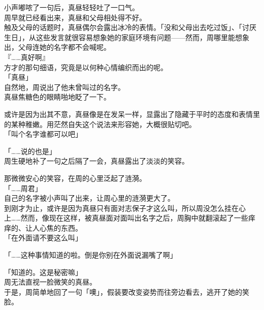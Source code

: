 小声嘟哝了一句后，真昼轻轻吐了一口气。\\

周早就已经看出来，真昼和父母相处得不好。\\

触及父母的话题时，真昼偶尔会露出冰冷的表情。「没和父母出去吃过饭」、「讨厌生日」，从这些发言就很容易想象她的家庭环境有问题——然而，周哪里能想象出，父母连她的名字都不会喊呢。\\

『……真好啊』\\

方才的那句细语，究竟是以何种心情编织而出的呢。\\

「真昼」\\

自然地，周说出了他未曾叫过的名字。\\

真昼焦糖色的眼睛啪地眨了一下。

或许是因为出其不意，真昼像是在发呆一样，显露出了隐藏于平时的态度和表情里的某种稚嫩。用茫然自失这个说法来形容她，大概很贴切吧。\\

「叫个名字谁都可以吧」

「……说的也是」\\

周生硬地补了一句之后隔了一会，真昼露出了淡淡的笑容。

那微微安心的笑容，在周的心里泛起了涟漪。\\

「……周君」\\

自己的名字被小声叫了出来，让周心里的涟漪更大了。\\

到刚才为止，或许是因为真昼只有面对志保子才这么叫，所以周没怎么挂在心上……然而，像现在这样，被真昼面对面叫出名字之后，周胸中就翻滚起了一些痒痒的、让人心焦的东西。\\

「在外面请不要这么叫」

「……这种事情知道的啦。倒是你别在外面说漏嘴了啊」

「知道的。这是秘密嘛」\\

周无法直视一脸微笑的真昼。\\

于是，周简单地回了一句「噢」，假装要改变姿势而往旁边看去，逃开了她的笑脸。

